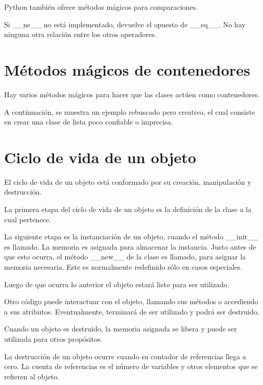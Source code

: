 \documentclass{report}
\begin{document}
Python también ofrece métodos mágicos para comparaciones.


Si \_\_ne\_\_ no está implementado, devuelve el opuesto de \_\_eq\_\_. No hay ninguna otra relación entre los otros operadores.


\section{Métodos mágicos de contenedores}

Hay varios métodos mágicos para hacer que las clases actúen como contenedores.


A continuación, se muestra un ejemplo rebuscado pero creativo, el cual consiste en crear una clase de lista poco confiable o imprecisa.



\section{Ciclo de vida de un objeto}

El ciclo de vida de un objeto está conformado por su creación, manipulación y destrucción.

La primera etapa del ciclo de vida de un objeto es la definición de la clase a la cual pertenece.

La siguiente etapa es la instanciación de un objeto, cuando el método \_\_init\_\_ es llamado. La memoria es asignada para almacenar la instancia. Justo antes de que esto ocurra, el método \_\_new\_\_ de la clase es llamado, para asignar la memoria necesaria. Este es normalmente redefinido sólo en casos especiales.

Luego de que ocurra lo anterior el objeto estará listo para ser utilizado.

Otro código puede interactuar con el objeto, llamando sus métodos o accediendo a sus atributos. Eventualmente, terminará de ser utilizado y podrá ser destruido.

Cuando un objeto es destruido, la memoria asignada se libera y puede ser utilizada para otros propósitos.

La destrucción de un objeto ocurre cuando su contador de referencias llega a cero. La cuenta de referencias es el número de variables y otros elementos que se refieren al objeto.
\end{document}
